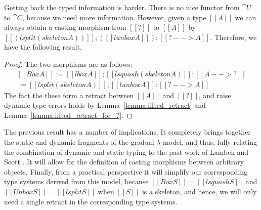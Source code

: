 Getting back the typed information is harder.  There is no nice
functor from $\cat{U}$ to $\cat{C}$, because we need more information.
However, given a type $[[A]]$ we can always obtain a casting morphism
from $[[?]]$ to $[[A]]$ by $[[(lsplit (skeleton A))]];([[lunbox A]]) :
[[? --> A]]$.  Therefore, we have the following result.
\begin{proof}
  The two morphisms are as follows:
  \[
  \begin{array}{lll}
    [[Box A]] := [[lbox A]];[[lsquash (skeleton A)]] : [[A --> ?]]\\
    [[Unbox A]] := [[lsplit (skeleton A)]];[[lunbox A]] : [[? --> A]]
  \end{array}
  \]
  \noindent
  The fact the these form a retract between $[[A]]$ and $[[?]]$, and
  raise dynamic type errors holds by Lemma~\ref{lemma:lifted_retract}
  and Lemma~\ref{lemma:lifted_retract_for_?}.
\end{proof}
The previous result has a number of implications.  It completely
brings together the static and dynamic fragments of the gradual
$\lambda$-model, and thus, fully relating the combination of dynamic
and static typing to the past work of Lambek and Scott
\cite{Scott:1980,Lambek:1980}.  It will allow for the definition of
casting morphisms between arbitrary objects.  Finally, from a
practical perspective it will simplify our corresponding type systems
derived from this model, because $[[Box S]] = [[lsquash S]]$ and
$[[Unbox S]] = [[lsplit S]]$ when $[[S]]$ is a skeleton, and hence, we
will only need a single retract in the corresponding type systems.



